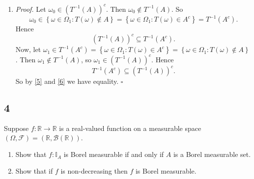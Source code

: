 \documentclass[12pt]{article}
\newcounter{ProofCounter}
\newenvironment{Proof}{\stepcounter{ProofCounter}\textit{Proof.}}{\hfill$\square$}
\begin{document}
\begin{enumerate}[label=(\alph*)]
\item

\begin{Proof}
Let $\omega_0 \in \left( T^{-1}(A) \right)^{c}$. Then $\omega_0 \notin T^{-1}(A)$. So 
\[ \omega_0 \in \left\{ \omega \in \Omega_1 : T(\omega) \notin A \right\} =  \left\{ \omega \in \Omega_1 : T(\omega) \in A^{c} \right\} =
T^{-1}(A^{c}). \]
Hence 
\begin{equation}
\left( T^{-1}(A) \right)^{c} \subseteq T^{-1}(A^{c}).
\label{5}
\end{equation}
Now, let $\omega_1 \in T^{-1}(A^{c}) = \left\{ \omega\in \Omega_1 : T(\omega) \in A^{c} \right\} = \left\{ \omega \in \Omega_1 : T(\omega) \notin A
\right\}$. Then $\omega_1 \notin T^{-1}(A)$, so $\omega_1 \in \left( T^{-1}(A) \right)^{c}$. Hence 
\begin{equation}
T^{-1}(A^{c}) \subseteq \left( T^{-1}(A) \right)^{c}.
\label{6}
\end{equation}
So by \ref{5} and \ref{6} we have equality.
\end{Proof}
\end{enumerate}



\subsection*{4}
\begin{tcolorbox}
Suppose $f : \mathbb{R} \rightarrow \mathbb{R}$ is a real-valued function on a measurable space $(\Omega, \mathcal{F}) = (\mathbb{R},
\mathcal{B}(\mathbb{R}))$. 
\begin{enumerate}[label=(\alph*)]
\item Show that $f : \mathbb{I}_{A}$ is Borel measurable if and only if $A$ is a Borel measurable set. 
\item Show that if $f$ is non-decreasing then $f$ is Borel measurable.
\end{enumerate}
\end{tcolorbox}
\end{document}

